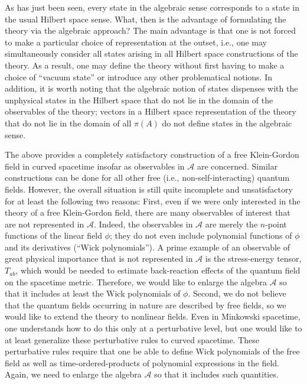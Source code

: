 \documentclass[12pt,epsf,amsfonts,amssymb]{article}
\begin{document}
As has just been seen, every state in the algebraic sense corresponds
to a state in the usual Hilbert space sense. What, then is the
advantage of formulating the theory via the algebraic approach? The
main advantage is that one is not forced to make a particular choice
of representation at the outset, i.e., one may simultaneously consider
all states arising in all Hilbert space constructions of the
theory. As a result, one may define the theory without first having to
make a choice of ``vacuum state'' or introduce any other problematical
notions. In addition, it is worth noting that the
algebraic notion of states dispenses with the unphysical states in the
Hilbert space that do not lie in the domain of the observables of the
theory; vectors in a Hilbert space representation of the theory that
do not lie in the domain of all $\pi(A)$ do not define states in the
algebraic sense.

The above provides a completely satisfactory construction of a free
Klein-Gordon field in curved spacetime insofar as observables in
$\mathcal A$ are concerned. Similar constructions can be done for all
other free (i.e., non-self-interacting) quantum fields. However, the
overall situation is still quite incomplete and unsatisfactory for at
least the following two reasons: First, even if we were only
interested in the theory of a free Klein-Gordon field, there are many
observables of interest that are not represented in $\mathcal
A$. Indeed, the observables in $\mathcal A$ are merely the $n$-point
functions of the linear field $\phi$; they do not even include
polynomial functions of $\phi$ and its derivatives (``Wick
polynomials''). A prime example of an observable of great physical
importance that is not represented in $\mathcal A$ is the
stress-energy tensor, $T_{ab}$, which would be needed to estimate
back-reaction effects of the quantum field on the spacetime
metric. Therefore, we would like to enlarge the algebra $\mathcal A$
so that it includes at least the Wick polynomials of $\phi$. Second,
we do not believe that the quantum fields occurring in nature are
described by free fields, so we would like to extend the theory to
nonlinear fields. Even in Minkowski spacetime, one understands how to
do this only at a perturbative level, but one would like to at least
generalize these perturbative rules to curved spacetime. These
perturbative rules require that one be able to define Wick polynomials
of the free field as well as time-ordered-products of polynomial
expressions in the field. Again, we need to enlarge the algebra
$\mathcal A$ so that it includes such quantities.
\end{document}
